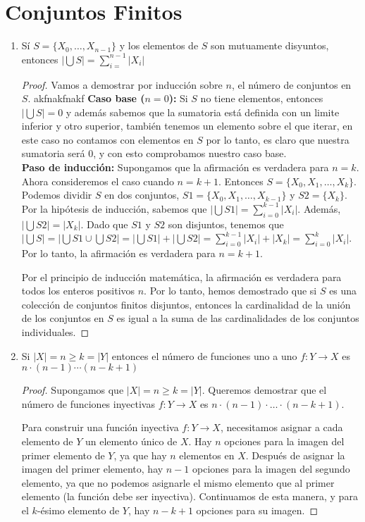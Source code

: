 \documentclass{article}
\begin{document}
\section{Conjuntos Finitos}
\begin{enumerate}
  \item Sí $ S = \{X_0,\ldots,X_{n-1}\}$ y los elementos de $S$ son mutuamente disyuntos, entonces $|\bigcup S|=\sum_{i=}^{n-1}|X_i|$
    \begin{proof}
      Vamos a demostrar por inducción sobre $n$, el número de conjuntos en $S$.
akfnakfnakf
      \textbf{Caso base ($n = 0$):} Si $S$ no tiene elementos, entonces $|\bigcup S| = 0$ y además sabemos que la sumatoria está definida con un limite inferior y otro superior, también tenemos un elemento sobre el que iterar, en este caso no contamos con elementos en $S$ por lo tanto, es claro que nuestra sumatoria será 0, y con esto comprobamos nuestro caso base.\\  
      \textbf{Paso de inducción:} Supongamos que la afirmación es verdadera para $n = k$. Ahora consideremos el caso cuando $n = k + 1$. Entonces $S = \{X_0, X_1, \ldots, X_k\}$. Podemos dividir $S$ en dos conjuntos, $S1 = \{X_0, X_1, \ldots, X_{k-1}\}$ y $S2 = \{X_k\}$. Por la hipótesis de inducción, sabemos que $|\bigcup S1| = \sum_{i=0}^{k-1} |X_i|$. Además, $|\bigcup S2| = |X_k|$. Dado que $S1$ y $S2$ son disjuntos, tenemos que $|\bigcup S| = |\bigcup S1 \cup \bigcup S2| = |\bigcup S1| + |\bigcup S2| = \sum_{i=0}^{k-1} |X_i| + |X_k| = \sum_{i=0}^{k} |X_i|$. Por lo tanto, la afirmación es verdadera para $n = k + 1$.

      Por el principio de inducción matemática, la afirmación es verdadera para todos los enteros positivos $n$. Por lo tanto, hemos demostrado que si $S$ es una colección de conjuntos finitos disjuntos, entonces la cardinalidad de la unión de los conjuntos en $S$ es igual a la suma de las cardinalidades de los conjuntos individuales.
    \end{proof}


  \item Si $|X| = n \geq k = |Y|$ entonces el número de funciones uno a uno $f: Y \rightarrow X $ es $n \cdot (n-1) \cdots (n-k+1)$


    \begin{proof}
      Supongamos que $|X| = n \geq k = |Y|$. Queremos demostrar que el número de funciones inyectivas $f : Y \rightarrow X$ es $n \cdot (n - 1) \cdot \ldots \cdot (n - k + 1)$.

      Para construir una función inyectiva $f : Y \rightarrow X$, necesitamos asignar a cada elemento de $Y$ un elemento único de $X$. Hay $n$ opciones para la imagen del primer elemento de $Y$, ya que hay $n$ elementos en $X$. Después de asignar la imagen del primer elemento, hay $n - 1$ opciones para la imagen del segundo elemento, ya que no podemos asignarle el mismo elemento que al primer elemento (la función debe ser inyectiva). Continuamos de esta manera, y para el $k$-ésimo elemento de $Y$, hay $n - k + 1$ opciones para su imagen.


\end{proof}
\end{enumerate}
\end{document}
